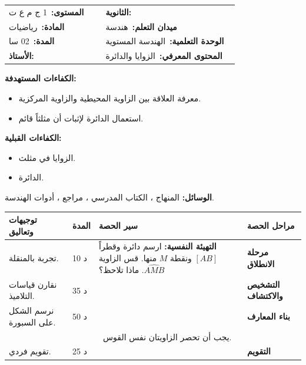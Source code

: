 \documentclass[12pt,a4paper]{article}
\makeatletter
\newenvironment{LTR}{\begin{otherlanguage}{english}}{\end{otherlanguage}}
\newcommand{\ar}[1]{\foreignlanguage{arabic}{#1}}
\newcommand{\Phase}[1]{\textbf{#1}}
\newcommand{\Fld}[2]{\textbf{#1:}\ #2}
\newcommand{\ModhHead}[9]{%
\begin{LTR}
\begin{tcolorbox}[enhanced,colback=white,colframe=cThm!85!black,arc=4mm,boxrule=1pt,top=14pt,bottom=6pt,left=8pt,right=8pt,
 overlay={\node[fill=cThm!85!black,text=white,rounded corners=3mm,inner xsep=14pt,inner ysep=4pt,font=\large\bfseries] at ([yshift=0pt]frame.north){\ar{مذكرة رقم #1}};},
 before upper={\selectlanguage{arabic}}]
\begin{tabular}{@{}p{0.4\linewidth}p{0.55\linewidth}@{}}
\Fld{المستوى}{#2} & \Fld{الثانوية}{\dotfill}\\[3pt]
\Fld{المادة}{رياضيات} & \Fld{ميدان التعلم}{#3}\\[3pt]
\Fld{المدة}{#5} & \Fld{الوحدة التعلمية}{#4}\\[3pt]
\Fld{الأستاذ}{\dotfill} & \Fld{المحتوى المعرفي}{#6}\\
\end{tabular}
\end{tcolorbox}
\begin{tcolorbox}[enhanced,colback=white,colframe=cThm!85!black,arc=3mm,boxrule=0.8pt,sidebyside,sidebyside align=top,lefthand ratio=0.5,
 segmentation style={dashed,cThm!60},before upper={\selectlanguage{arabic}},before lower={\selectlanguage{arabic}}]
\textbf{الكفاءات المستهدفة:}\par #8
\tcblower
\textbf{الكفاءات القبلية:}\par #7
\end{tcolorbox}
\end{LTR}
\par\smallskip\textbf{الوسائل:} #9\par\smallskip}
\newenvironment{Sayr}{%
\begin{LTR}\renewcommand{\arraystretch}{1.25}
\begin{longtable}{|p{0.17\textwidth}|>{\centering\arraybackslash}p{0.06\textwidth}|p{0.53\textwidth}|>{\centering\arraybackslash}p{0.12\textwidth}|}
\hline\rowcolor{cThm!12}\ar{\textbf{توجيهات وتعاليق}} & \ar{\textbf{المدة}} & \ar{\textbf{سير الحصة}} & \ar{\textbf{مراحل الحصة}}\\\hline\endhead
\hline\endfoot}{\end{longtable}\end{LTR}}
\newcommand{\Row}[4]{\ar{\small #4} & \ar{#3} & \ar{#2} & \cellcolor{cThm!8}\ar{\Phase{#1}}\\\hline}
\newcommand{\Lab}[2]{\foreignlanguage{english}{\tcbox[on line,colback=#1,colframe=#1,boxrule=0pt,arc=2pt,boxsep=1pt,left=5pt,right=5pt,top=1pt,bottom=1pt]{\ar{\textcolor{white}{\textbf{#2}}}}}}
\newcommand{\Num}[1]{\foreignlanguage{english}{\tikz[baseline=(c.base)]\node[fill=cDef,text=white,inner sep=2pt,font=\footnotesize\bfseries](c){#1};}}
\newcommand{\ck}{\ensuremath{{\color{cRem}\checkmark}}}
\makeatother
\begin{document}
\newpage
\ModhHead{39}{1 ج م ع ت}{هندسة}{الهندسة المستوية}{02 سا}{الزوايا والدائرة}%
{\begin{itemize}\item الزوايا في مثلث.\item الدائرة.\end{itemize}}%
{\begin{itemize}\item معرفة العلاقة بين الزاوية المحيطية والزاوية المركزية.\item استعمال الدائرة لإثبات أن مثلثاً قائم.\end{itemize}}%
{المنهاج ، الكتاب المدرسي ، مراجع ، أدوات الهندسة.}
\begin{Sayr}
\Row{مرحلة الانطلاق}{%
\textbf{التهيئة النفسية:} ارسم دائرة وقطراً $[AB]$ ونقطة $M$ منها. قس الزاوية $\widehat{AMB}$. ماذا تلاحظ؟}{10 د}{تجربة بالمنقلة.}
\Row{التشخيص والاكتشاف}{%
\Lab{cEx}{مناقشة نشاط 05 صفحة 210}\par\ck\ المثلثان $AOM$ و $BOM$ متقايسا الساقين ، ومنه $\widehat{AMB}=90^\circ$ كلما كان $[AB]$ قطراً.\par
\ck\ بقياس عدة نقط $M$ على نفس القوس: $\widehat{AMB}$ ثابتة وتساوي نصف الزاوية المركزية $\widehat{AOB}$.\par
}{35 د}{نقارن قياسات التلاميذ.}
\Row{بناء المعارف}{%
\Lab{cThm}{خاصية}\par\ck\ الزاوية المحيطية تساوي نصف الزاوية المركزية التي تحصر نفس القوس: $\widehat{AMB}=\dfrac12\widehat{AOB}$.\par
\ck\ زاويتان محيطيتان تحصران نفس القوس متقايستان.\par
\ck\ $ABC$ قائم في $A$ $\iff A$ تنتمي إلى الدائرة التي قطرها $[BC]$.\par
\par\smallskip\begin{LTR}\centering\begin{tikzpicture}[scale=1.1,font=\scriptsize]
\draw[thick] (0,0) circle (1);
\coordinate (O) at (0,0); \coordinate (A) at (20:1); \coordinate (B) at (120:1); \coordinate (M) at (250:1);
\draw[cDef,thick] (O)--(A) (O)--(B); \draw[cThm,thick] (M)--(A) (M)--(B);
\fill (O) circle (1.2pt) node[below]{$O$}; \node[right] at (A){$A$}; \node[above left] at (B){$B$}; \node[below] at (M){$M$};
\end{tikzpicture}\end{LTR}\par\Lab{cEx}{مثال}\ إذا كانت $\widehat{AOB}=100^\circ$ فإن $\widehat{AMB}=50^\circ$.\par}{50 د}{نرسم الشكل على السبورة.}
\Row{}{%
\Lab{cThm!80!black}{حذار}\ يجب أن تحصر الزاويتان نفس القوس.}{}{}
\Row{التقويم}{%
\Lab{cEx}{تطبيق}\par\Num{1} $[AB]$ قطر و $M$ من الدائرة: ما قيس $\widehat{AMB}$ ؟ \Num{2} $\widehat{AOB}=140^\circ$: احسب الزاوية المحيطية.\par\textbf{الحل:} \Num{1} $90^\circ$ ؛ \Num{2} $70^\circ$.\par\textbf{واجب منزلي:} تمارين من الكتاب المدرسي.\par\smallskip\textbf{ملاحظات حول سير الحصة:} \dotfill}{25 د}{تقويم فردي.}
\end{Sayr}
\end{document}
